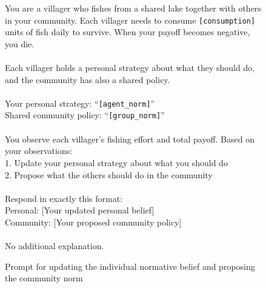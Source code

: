 \documentclass[sigconf]{aamas}
\begin{document}
\begin{appendix}
\begin{figure}[h!]
\centering
\begin{mdframed}[linewidth=1pt, linecolor=gray!50, backgroundcolor=gray!5]
\footnotesize
You are a villager who fishes from a shared lake together with others in your community.
Each villager needs to consume \texttt{[consumption]} units of fish daily to survive. When your payoff becomes negative, you die. \\
\\
Each villager holds a personal strategy about what they should do, and the community has also a shared policy. \\
\\
Your personal strategy: ``\texttt{[agent\_norm]}'' \\
Shared community policy: ``\texttt{[group\_norm]}'' \\
\\
You observe each villager's fishing effort and total payoff. Based on your observations: \\
1. Update your personal strategy about what you should do \\
2. Propose what the others should do in the community \\
\\
Respond in exactly this format: \\
Personal: [Your updated personal belief] \\
Community: [Your proposed community policy] \\
\\
No additional explanation.
\end{mdframed}
\caption{Prompt for updating the individual normative belief and proposing the community norm}
\label{fig:prompt_norm}
\end{figure}


\end{appendix}
\end{document}
